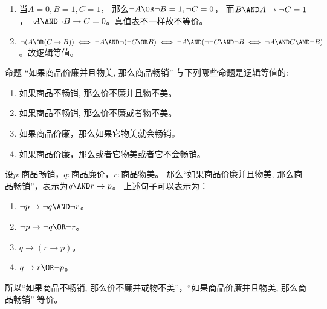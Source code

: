 \documentclass{ctexart}
\begin{document}
\begin{solution}
  \begin{enumerate}
    \item 当\(A = 0, B=1,C=1\)， 那么\(\neg A \OR \neg B = 1, \neg C=0\)， 而\(B \AND A \to \neg C = 1\)，\(\neg A \AND \neg B \to C = 0\)。真值表不一样故不等价。
    \item \(\neg(A \OR(C \to B)) \iff \neg A \AND \neg (\neg C \OR B) \iff \neg A \AND (\neg \neg C \AND \neg B \iff \neg A \AND C \AND \neg B)\)。故逻辑等值。

  \end{enumerate}

\end{solution}

\begin{problem}\label{pro:8}

  命题 “如果商品价廉并且物美, 那么商品畅销” 与下列哪些命题是逻辑等值的:
  \begin{enumerate}
    \item 如果商品不畅销, 那么价不廉并且物不美。
    \item 如果商品不畅销, 那么价不廉或者物不美。
    \item 如果商品价廉，那么如果它物美就会畅销。
    \item 如果商品价廉，那么或者它物美或者它不会畅销。
  \end{enumerate}

\end{problem}

\begin{solution}
  设\(p:\text{商品畅销}\)，\(q:\text{商品廉价}\)，\(r:\text{商品物美}\)。
  那么“如果商品价廉并且物美, 那么商品畅销”，表示为\(q \AND r \to p\)。
  上述句子可以表示为：
  \begin{enumerate}
    \item \(\neg p \to \neg q \AND \neg r\)。
    \item \(\neg p \to \neg q \OR \neg r\)。
    \item \(q \to (r \to p)\)。
    \item \(q \to r \OR \neg p\)。
  \end{enumerate}
  所以“如果商品不畅销, 那么价不廉并或物不美”，“如果商品价廉并且物美, 那么商品畅销” 等价。
\end{solution}
\end{document}
